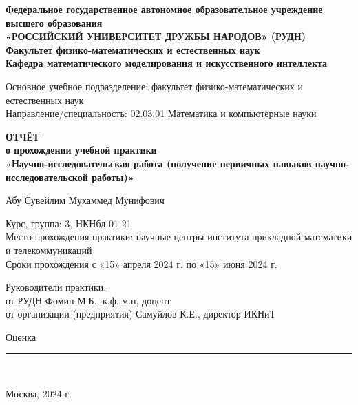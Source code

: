 \documentclass[14pt,onecolumn,a4paper]{article}
\newcommand{\notes}[3][\empty]{%
    \noindent Оценка\vspace{5pt}
        {\rule{#3}{0.5pt}\\}
}
\begin{document}
\fontsize{14pt}{17pt}\selectfont
\def\contentsname{Содержание}

\begin{titlepage}
\begin{center}
\textbf{Федеральное государственное автономное образовательное учреждение высшего образования\\
«РОССИЙСКИЙ УНИВЕРСИТЕТ ДРУЖБЫ НАРОДОВ»
(РУДН)
\\[5mm]
Факультет физико-математических и естественных наук\\[2mm]
Кафедра математического моделирования и искусственного интеллекта}
\end{center}

\vfill

\begin{flushleft}
Основное учебное подразделение: факультет физико-математических и естественных наук\\
Направление/специальность: 02.03.01 Математика и компьютерные науки
\end{flushleft}

\begin{center}
\textbf{ОТЧЁТ\\[3mm]
о прохождении учебной практики\\[3mm]
«Научно-исследовательская работа (получение первичных навыков научно-исследовательской работы)» 
\\[20mm]
}
\end{center}

\hfill
\begin{center}
Абу Сувейлим Мухаммед Мунифович\\
\end{center}

\begin{flushleft}
Курс, группа: 3, НКНбд-01-21\\[3mm]
Место прохождения практики: научные центры института прикладной математики и телекоммуникаций \\[6mm]
Сроки прохождения с «15» апреля 2024 г. по «15» июня 2024 г. 
\end{flushleft}

\vfill

\begin{minipage}{7cm}
{Руководители практики:\\[3mm]
от РУДН Фомин М.Б., к.ф.-м.н, доцент\\ 
от организации (предприятия)  Самуйлов К.Е., директор ИКНиТ}
\end{minipage}

\vspace{12mm}	
\notes{1}{0.5\textwidth}

\vfill

\begin{center}
 Москва, 2024 г.
\end{center}

\end{titlepage}


\tableofcontents
\newpage

\printbibliography %
\end{document}
